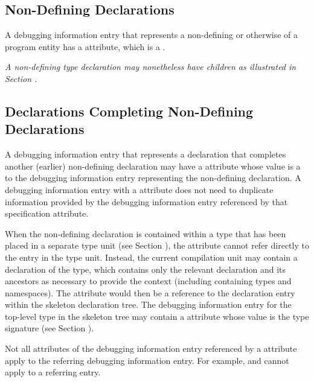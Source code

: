 \subsection{Non-Defining Declarations}
A debugging information entry that
represents a non-defining
or otherwise
of a program entity has a
\DWATdeclarationDEFN{} attribute, which is a
.

\textit{A non-defining type declaration may nonetheless have
children as illustrated in Section
.}


\subsection{Declarations Completing Non-Defining Declarations}
\hypertarget{chap:DWATspecificationincompletenondefiningorseparatedeclaration}{}
A debugging information entry that represents a declaration
that completes another (earlier) non-defining declaration may have a
\DWATspecificationDEFN{}
attribute whose value is a  to
the debugging information entry representing the non-defining declaration.
A debugging information entry with a
\DWATspecificationNAME{}
attribute does not need to duplicate information provided by the
debugging information entry referenced by that specification attribute.

When the non-defining declaration is contained within a type that has
been placed in a separate type unit (see Section ),
the \DWATspecification{} attribute cannot refer directly to the entry in
the type unit. Instead, the current compilation unit may contain a
 declaration of the type, which contains only the relevant
declaration and its ancestors as necessary to provide the context
(including containing types and namespaces). The \DWATspecification{}
attribute would then be a reference to the declaration entry within
the skeleton declaration tree. The debugging information entry for the
top-level type in the skeleton tree may contain a \DWATsignature{}
attribute whose value is the type signature
(see Section ).

Not all attributes of the debugging information entry referenced by a
\DWATspecification{} attribute
apply to the referring debugging information entry.
For
example,
\DWATsibling{} and
\DWATdeclaration{}
cannot apply to a
referring
entry.


